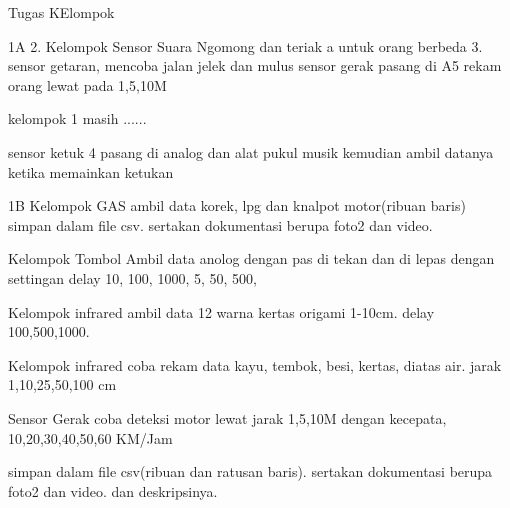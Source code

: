 Tugas KElompok

1A
2. Kelompok Sensor Suara
Ngomong dan teriak a untuk orang berbeda
3. sensor getaran, mencoba jalan jelek dan mulus
sensor gerak
pasang di A5 rekam orang lewat pada 1,5,10M

kelompok 1 masih ......

sensor ketuk 4
pasang di analog dan alat pukul musik kemudian ambil datanya ketika memainkan ketukan



1B
Kelompok GAS
ambil data korek, lpg dan knalpot motor(ribuan baris) simpan dalam file csv. sertakan dokumentasi berupa foto2 dan video.

Kelompok Tombol
Ambil data anolog dengan pas di tekan dan di lepas dengan settingan delay 10, 100, 1000, 5, 50, 500,

Kelompok infrared
ambil data 12 warna kertas origami 1-10cm. delay 100,500,1000.

Kelompok infrared
coba rekam data kayu, tembok, besi, kertas, diatas air. jarak 1,10,25,50,100 cm 

Sensor Gerak
coba deteksi motor lewat jarak 1,5,10M dengan kecepata, 10,20,30,40,50,60 KM/Jam


simpan dalam file csv(ribuan dan ratusan baris). sertakan dokumentasi berupa foto2 dan video. dan deskripsinya.